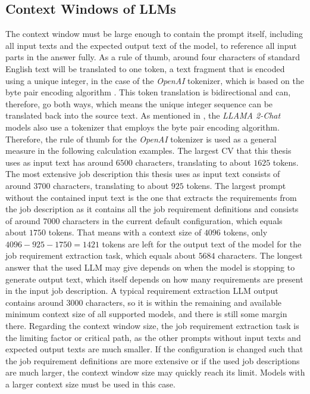\documentclass[draft,final]{thesisclass} %
\begin{document}
\subsection{Context Windows of \acs{LLM}s}
The context window must be large enough to contain the prompt itself, including all input texts and the expected output text of the model, to reference all input parts in the answer fully.
As a rule of thumb, around four characters of standard English text will be translated to one token, a text fragment that is encoded using a unique integer, in the case of the \textit{OpenAI} tokenizer, which is based on the byte pair encoding algorithm \parencite{openai_tokenizer}. 
This token translation is bidirectional and can, therefore, go both ways, which means the unique integer sequence can be translated back into the source text.
As mentioned in \textcite[6]{llama2}, the \textit{LLAMA 2-Chat} models also use a tokenizer that employs the byte pair encoding algorithm. Therefore, the rule of thumb for the \textit{OpenAI} tokenizer is used as a general measure in the following calculation examples.
The largest \acs{CV} that this thesis uses as input text has around $6500$ characters, translating to about $1625$ tokens.
The most extensive job description this thesis uses as input text consists of around $3700$ characters, translating to about $925$ tokens.
The largest prompt without the contained input text is the one that extracts the requirements from the job description as it contains all the job requirement definitions and consists of around $7000$ characters in the current default configuration, which equals about $1750$ tokens.
That means with a context size of $4096$ tokens, only $4096-925-1750=1421$ tokens are left for the output text of the model for the job requirement extraction task, which equals about $5684$ characters.
The longest answer that the used \acs{LLM} may give depends on when the model is stopping to generate output text, which itself depends on how many requirements are present in the input job description.
A typical requirement extraction \acs{LLM} output contains around $3000$ characters, so it is within the remaining and available minimum context size of all supported models, and there is still some margin there.
Regarding the context window size, the job requirement extraction task is the limiting factor or critical path, as the other prompts without input texts and expected output texts are much smaller.
If the configuration is changed such that the job requirement definitions are more extensive or if the used job descriptions are much larger, the context window size may quickly reach its limit. Models with a larger context size must be used in this case.
\end{document}
